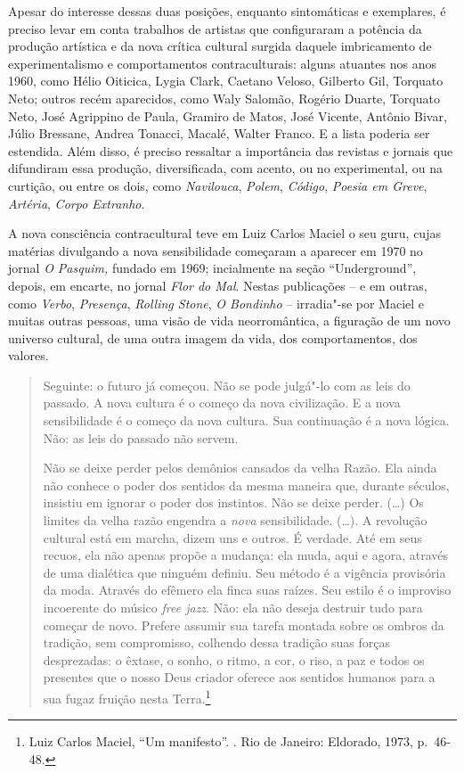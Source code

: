 Apesar do interesse dessas duas posições, enquanto sintomáticas e
exemplares, é preciso levar em conta trabalhos de artistas que
configuraram a potência da produção artística e da nova crítica cultural
surgida daquele imbricamento de experimentalismo e comportamentos
contraculturais: alguns atuantes nos anos 1960, como Hélio Oiticica,
Lygia Clark, Caetano Veloso, Gilberto Gil, Torquato Neto; outros recém %
aparecidos, como Waly Salomão, Rogério Duarte, Torquato Neto, José
Agrippino de Paula, Gramiro de Matos, José Vicente, Antônio Bivar, Júlio
Bressane, Andrea Tonacci, Macalé, Walter Franco. E a
lista poderia ser estendida. Além disso, é preciso ressaltar a
importância das revistas e jornais que difundiram essa produção,
diversificada, com acento, ou no experimental, ou na curtição, ou entre
os dois, como \emph{Navilouca}, \emph{Polem}, \emph{Código}, \emph{Poesia em Greve}, \emph{Artéria}, \emph{Corpo Extranho}.

\asterisc

A nova consciência contracultural teve em Luiz Carlos Maciel o seu guru,
cujas matérias divulgando a nova sensibilidade começaram a aparecer em
1970 no jornal \emph{O Pasquim,} fundado em 1969; incialmente na seção
``Underground'', depois, em encarte, no jornal \emph{Flor do Mal}.
Nestas publicações -- e em outras, como \emph{Verbo}, \emph{Presença}, \emph{Rolling
Stone}, \emph{O Bondinho} -- irradia"-se por Maciel e muitas outras pessoas, uma
visão de vida neorromântica, a figuração de um novo universo cultural,
de uma outra imagem da vida, dos comportamentos, dos valores.

\begin{quote}
Seguinte: o futuro já começou. Não se pode julgá"-lo com as leis do
passado. A nova cultura é o começo da nova civilização. E a nova
sensibilidade é o começo da nova cultura. Sua continuação é a nova
lógica. Não: as leis do passado não servem.

Não se deixe perder pelos demônios cansados da velha Razão. Ela ainda
não conhece o poder dos sentidos da mesma maneira que, durante séculos,
insistiu em ignorar o poder dos instintos. Não se deixe perder. (\ldots{}) Os
limites da velha razão engendra a \emph{nova} sensibilidade. (\ldots{}). A
revolução cultural está em marcha, dizem uns e outros. É verdade. Até em
seus recuos, ela não apenas propõe a mudança: ela muda, aqui e agora,
através de uma dialética que ninguém definiu. Seu método é a vigência
provisória da moda. Através do efêmero ela finca suas raízes. Seu estilo
é o improviso incoerente do músico \emph{free jazz}. Não: ela não deseja
destruir tudo para começar de novo. Prefere assumir sua tarefa montada
sobre os ombros da tradição, sem compromisso, colhendo dessa tradição
suas forças desprezadas: o êxtase, o sonho, o ritmo, a cor, o riso, a
paz e todos os presentes que o nosso Deus criador oferece aos sentidos
humanos para a sua fugaz fruição nesta Terra.\footnote{Luiz Carlos
  Maciel, ``Um manifesto''. {}. Rio de Janeiro:
  Eldorado, 1973, p.~46-48.}
\end{quote}

